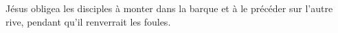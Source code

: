 \encetemps Jésus obligea les disciples
		à monter dans la barque et à le précéder sur l’autre rive,
	pendant qu’il renverrait les foules.
